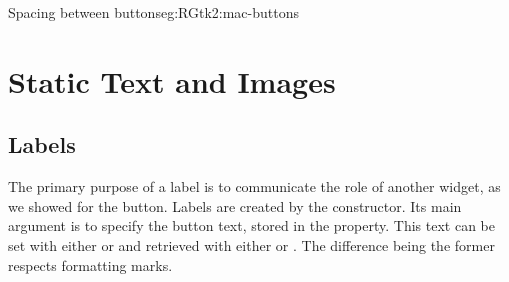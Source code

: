 \begin{example}{Spacing between buttons}{eg:RGtk2:mac-buttons}
\end{example}

\section{Static Text and Images}

\subsection{Labels}
\label{sec:RGtk2:gtkLabel}

The primary purpose of a label is to communicate the role of another
widget, as we showed for the button. Labels are created by the
 constructor. Its main argument is
 to specify the button text, stored in the
 property. This text can be set with either
 or  and
retrieved with either  or
.  The difference being the former
respects formatting marks.

